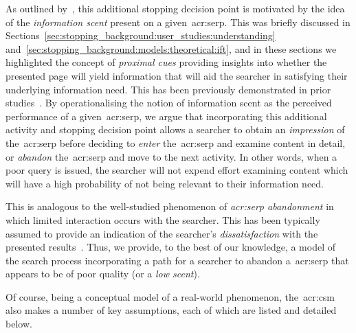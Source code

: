 As outlined by~\cite{maxwell2018serp}, this additional stopping decision point is motivated by the idea of the \emph{information scent} present on a given~\gls{acr:serp}. This was briefly discussed in Sections~\ref{sec:stopping_background:user_studies:understanding} and~\ref{sec:stopping_background:models:theoretical:ift}, and in these sections we highlighted the concept of \emph{proximal cues} providing insights into whether the presented page will yield information that will aid the searcher in satisfying their underlying information need. This has been previously demonstrated in prior studies~\citep{wu2014information_scent, ong2017scent_behaviour, maxwell2017snippets}. By operationalising the notion of information scent as the perceived performance of a given~\gls{acr:serp}, we argue that incorporating this additional activity and stopping decision point allows a searcher to obtain an \emph{impression} of the~\gls{acr:serp} before deciding to \emph{enter} the~\gls{acr:serp} and examine content in detail, or \emph{abandon} the~\gls{acr:serp} and move to the next activity. In other words, when a poor query is issued, the searcher will not expend effort examining content which will have a high probability of not being relevant to their information need.

This is analogous to the well-studied phenomenon of \emph{\gls{acr:serp} abandonment} in which limited interaction occurs with the searcher. This has been typically assumed to provide an indication of the searcher's \emph{dissatisfaction} with the presented results~\citep{dassarma2008serp_abandonment, chuklin2012serp_abandonment}. Thus, we provide, to the best of our knowledge, a model of the search process incorporating a path for a searcher to abandon a~\gls{acr:serp} that appears to be of poor quality (or a \emph{low scent}).

\noindent
{} Of course, being a conceptual model of a real-world phenomenon, the~\gls{acr:csm} also makes a number of key assumptions, each of which are listed and detailed below.

